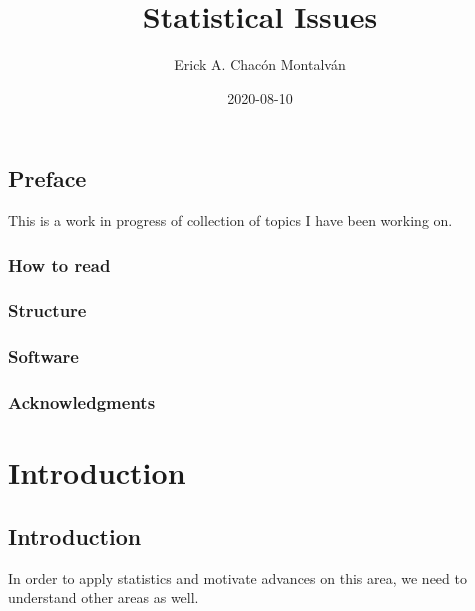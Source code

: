 \documentclass[]{book}
\title{Statistical Issues}
\author{Erick A. Chacón Montalván}
\date{2020-08-10}
\begin{document}
\maketitle

{
\setcounter{tocdepth}{1}
\tableofcontents
}
\hypertarget{preface}{%
\chapter*{Preface}\label{preface}}

This is a work in progress of collection of topics I have been working on.

\hypertarget{how-to-read}{%
\section*{How to read}\label{how-to-read}}

\hypertarget{structure}{%
\section*{Structure}\label{structure}}

\hypertarget{software}{%
\section*{Software}\label{software}}

\hypertarget{acknowledgments}{%
\section*{Acknowledgments}\label{acknowledgments}}

\hypertarget{part-introduction}{%
\part{Introduction}\label{part-introduction}}

\hypertarget{intro}{%
\chapter{Introduction}\label{intro}}

In order to apply statistics and motivate advances on this area, we need to
understand other areas as well.
\end{document}
